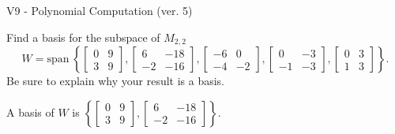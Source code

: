 \begin{exercise}
  \begin{exerciseTitle}V9 - Polynomial Computation (ver. 5)\end{exerciseTitle}
  \begin{exerciseStatement}
    Find a basis for the subspace of \(M_{2,2}\) 
\[W=\mathrm{span}\ \left\{\left[\begin{array}{cc}
0 & 9 \\
3 & 9
\end{array}\right] , \left[\begin{array}{cc}
6 & -18 \\
-2 & -16
\end{array}\right] , \left[\begin{array}{cc}
-6 & 0 \\
-4 & -2
\end{array}\right] , \left[\begin{array}{cc}
0 & -3 \\
-1 & -3
\end{array}\right] , \left[\begin{array}{cc}
0 & 3 \\
1 & 3
\end{array}\right]\right\}.\]
 Be sure to explain why your result is a basis.


  \end{exerciseStatement}
  \begin{exerciseAnswer}
   A basis of \(W\) is  \(\left\{\left[\begin{array}{cc}
0 & 9 \\
3 & 9
\end{array}\right] , \left[\begin{array}{cc}
6 & -18 \\
-2 & -16
\end{array}\right]\right\}\).
  


  \end{exerciseAnswer}
\end{exercise}